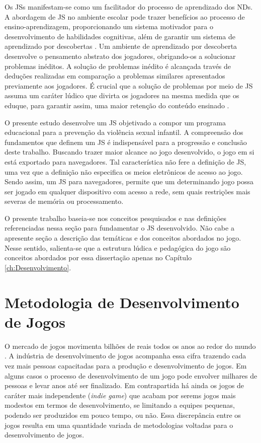 Os \acp{JS} manifestam-se como um facilitador do processo de aprendizado dos \acp{ND}. A abordagem de \ac{JS} no ambiente escolar pode trazer benefícios ao processo de ensino-aprendizagem, proporcionando um sistema motivador para o desenvolvimento de habilidades cognitivas, além de garantir um sistema de aprendizado por descobertas \cite{carvalho2017move4math}. Um ambiente de aprendizado por descoberta desenvolve o pensamento abstrato dos jogadores, obrigando-os a solucionar problemas inéditos. A solução de problemas inédito é alcançada través de deduções realizadas em comparação a problemas similares apresentados previamente aos jogadores. É crucial que a solução de problemas por meio de \ac{JS} assuma um caráter lúdico que divirta os jogadores na mesma medida que os eduque, para garantir assim, uma maior retenção do conteúdo ensinado \cite{tarouco2004jogos}. 

O presente estudo desenvolve um \ac{JS} objetivado a compor um programa educacional para a prevenção da violência sexual infantil. A compreensão dos fundamentos que definem um \ac{JS} é indispensável para a progressão e conclusão deste trabalho. Buscando trazer maior alcance ao jogo desenvolvido, o jogo em si está exportado para navegadores. Tal característica não fere a definição de \ac{JS}, uma vez que a definição não especifica os meios eletrônicos de acesso ao jogo. Sendo assim, um \ac{JS} para navegadores, permite que um determinando jogo possa ser jogado em qualquer dispositivo com acesso a rede, sem quais restrições mais severas de memória ou processamento. 

O presente trabalho baseia-se nos conceitos pesquisados e nas definições referenciadas nessa seção para fundamentar o \ac{JS} desenvolvido. Não cabe a apresente seção a descrição das temáticas e dos conceitos abordados no jogo. Nesse sentido, salienta-se que a estrutura lúdica e pedagógica do jogo são conceitos abordados por essa dissertação apenas no Capítulo \ref{ch:Desenvolvimento}.


\section{Metodologia de Desenvolvimento de Jogos}\label{sec:Engenharia}

O mercado de jogos movimenta bilhões de reais todos os anos ao redor do mundo \cite{fortim2020games}. A indústria de desenvolvimento de jogos acompanha essa cifra trazendo cada vez mais pessoas capacitadas para a produção e desenvolvimento de jogos. Em alguns casos o processo de desenvolvimento de um jogo pode envolver milhares de pessoas e levar anos até ser finalizado. Em contrapartida há ainda os jogos de caráter mais independente (\textit{indie game}) que acabam por serems jogos mais modestos em termos de desenvolvimento, se limitando a equipes pequenas, podendo ser produzidos em pouco tempo, ou não. Essa discrepância entre os jogos resulta em uma quantidade variada de metodologias voltadas para o desenvolvimento de jogos.

